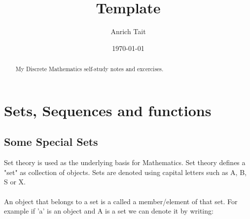 \documentclass[12pt, letterpaper]{report}
\title{Template}
\author{Anrich Tait}
\date{\today}
\begin{document}
\restoregeometry %
\nopagecolor%

\tableofcontents
\begin{abstract}
My Discrete Mathematics self-study notes and excercises.
\end{abstract}

\chapter{Sets, Sequences and functions}

\section{Some Special Sets}
Set theory is used as the underlying basis for Mathematics.
Set theory defines a "set" as collection of objects. Sets are denoted using 
capital letters such as A, B, S or X.\\\\

An object that belongs to a set is a called a member/element of that set. For 
example if 'a' is an object and A is a set we can denote it by writing:\\
\end{document}

